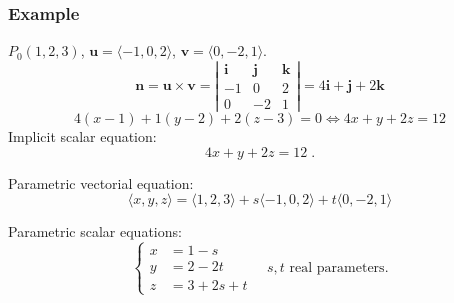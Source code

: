 \begin{frame}
\begin{columns}
{\begin{figure}
    \end{figure}}
\end{columns}
\end{frame}


\begin{frame}
 \frametitle{Example}

$P_0(1,2,3)$, $\textbf{u}=\langle -1,0,2\rangle$, $\textbf{v} = \langle 0,-2,1\rangle$.\pause
%
$$\textbf{n} = \textbf{u} \times \textbf{v} = \left| \begin{array}{ccc}
                           \textbf{i} & \textbf{j} & \textbf{k} \\
			   -1 & 0 & 2 \\
                           0 & -2 & 1
                          \end{array}
\right| = 4\textbf{i}+\textbf{j} +2\textbf{k}$$
%
$$4(x-1)+1(y-2) + 2(z-3) = 0 \Longleftrightarrow 4x+y+2z = 12$$
%
\pause Implicit scalar equation:
%
$$4x+y+2z = 12\; .$$

\pause Parametric vectorial equation:
%
$$\langle x, y, z \rangle = \langle 1,2,3\rangle + s\langle -1, 0, 2\rangle + t\langle 0,-2,1\rangle$$

\pause Parametric scalar equations:
%
$$\left\{ \begin{array}{ll}
           x & = 1 -s \\
           y & = 2-2t \\
           z & = 3 +2s +t
          \end{array}
\right. \quad s,t \text{ real parameters}.$$
%
\end{frame}

